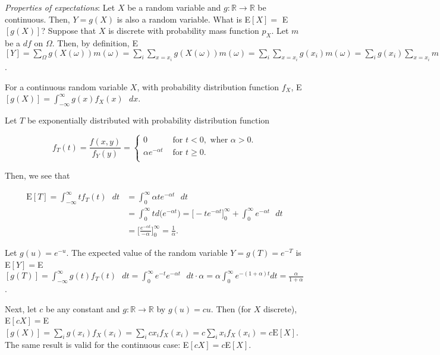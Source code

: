 \documentclass[12pt]{article}
\newcommand{\R}{\mathbb{R}}
\newcommand{\nspace}{\vspace*{.5cm}}
\newcommand{\nline}{\nspace \noindent}
\begin{document}
\nline
\textit{Properties of expectations}: Let $X$ be a random variable and $g : \R \rightarrow \R$ be continuous. Then, $Y = g(X)$ is also a random variable. What is E$[X] =$ E$[g(X)]$? Suppose that $X$ is discrete with probability mass function $p_X$. Let $m$ be a $df$ on $\Omega$. Then, by definition, E$[Y] = \sum_{\Omega} g(X(\omega)) m(\omega) = \sum_{i} \sum_{x = x_i} g(X(\omega)) m(\omega) = \sum_{i} \sum_{x = x_i} g(x_i) m(\omega) = \sum_{i} g(x_i) \sum_{x = x_i} m(\omega) = \sum_{i} g(x_i) \mathbb{P}(X = x_i) = \sum_{i} g(x_i) p_X(x_i)$.

\nline
For a continuous random variable $X$, with probability distribution function $f_X$, E$[g(X)] = \int_{- \infty}^{\infty} g(x) f_X (x) \text{ } dx$. 

\begin{tcolorbox}
Let $T$ be exponentially distributed with probability distribution function 

\[ f_T(t) = \frac{f(x,y)}{f_Y(y)} = \begin{cases} 
	  0 & \text{ for } t < 0, \text{ wher } \alpha > 0. \\
      \alpha e^{- \alpha t} & \text{ for } t \geq 0. \\
      \end{cases} \]
      
\nline
Then, we see that

\begin{align*}
\text{E}[T] = \int_{- \infty}^{\infty} t f_T (t) \text{ } dt &= \int_{0}^{\infty} \alpha t e^{- \alpha t} \text{ } dt \\
&= \int_{0}^{\infty} t d \big ( e^{- \alpha t} \big ) = \Bigg [ -t e^{- \alpha t} \Bigg ]_{0}^{\infty} + \int_{0}^{\infty} e^{- \alpha t} \text{ } dt \\
&= \Bigg [ \frac{e^{- \alpha t}}{- \alpha} \Bigg ]_{0}^{\infty} = \frac{1}{\alpha}.
\end{align*}

Let $g(u) = e^{- u}$. The expected value of the random variable $Y = g(T) = e^{-T}$ is E$[Y]=$E$[g(T)] = \int_{- \infty}^{\infty} g(t) f_T (t) \text{ } dt = \int_{0}^{\infty}e^{-t} e^{- \alpha t} \text{ }  dt \cdot \alpha = \alpha \int_{0}^{\infty} e^{-(1 + \alpha) t} dt = \frac{\alpha}{1 + \alpha}$.

\nline
Next, let $c$ be any constant and $g : \R \rightarrow \R$ by $g(u) = cu$. Then (for $X$ discrete), E$[cX] = $E$[g(X)] = \sum_{i} g(x_i) f_X(x_i) = \sum_{i} c x_i f_X (x_i) = c \sum_{i} x_i f_X(x_i) = c \text{E}[X]$. The same result is valid for the continuous case: E$[cX]=c$E$[X]$.
\end{tcolorbox}
\end{document}
